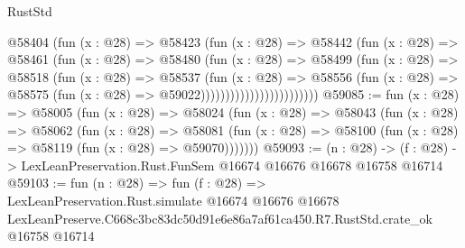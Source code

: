 \begin{lexlean}{RustStd}
\begin{coremodule}
                              @58404
                                (fun (x : @28) =>
                                @58423
                                  (fun (x : @28) =>
                                  @58442
                                    (fun (x : @28) =>
                                    @58461
                                      (fun (x : @28) =>
                                      @58480
                                        (fun (x : @28) =>
                                        @58499
                                          (fun (x : @28) =>
                                          @58518
                                            (fun (x : @28) =>
                                            @58537
                                              (fun (x : @28) =>
                                              @58556
                                                (fun (x : @28) =>
                                                @58575
                                                  (fun (x : @28) => @59022))))))))))))))))))))))))
@59085 := fun (x : @28) =>
  @58005
    (fun (x : @28) =>
    @58024
      (fun (x : @28) =>
      @58043
        (fun (x : @28) =>
        @58062
          (fun (x : @28) =>
          @58081 (fun (x : @28) => @58100 (fun (x : @28) => @58119 (fun (x : @28) => @59070)))))))
@59093 := (n : @28) ->
  (f : @28) -> LexLeanPreservation.Rust.FunSem @16674 @16676 @16678 @16758 @16714
@59103 := fun (n : @28) =>
  fun (f : @28) =>
  LexLeanPreservation.Rust.simulate
    @16674
    @16676
    @16678
    LexLeanPreserve.C668c3bc83dc50d91e6e86a7af61ca450.R7.RustStd.crate_ok
    @16758
    @16714
\end{coremodule}
\end{lexlean}
